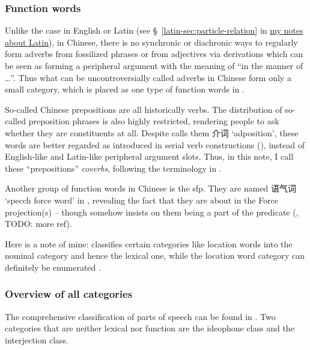 \documentclass[UTF8, a4paper, oneside, scheme=plain]{ctexart}
\newcommand*{\citesec}[1]{\S~{#1}}
\newcommand*{\term}[1]{\emph{#1}}
\newcommand{\latin}{\href{../Latin/latin-notes.pdf}{my notes about Latin}}
\newcommand{\translate}[1]{`#1'}
\begin{document}
\subsubsection{Function words}\label{sec:function-word-introduction}

Unlike the case in English or Latin 
(see \citesec{\ref{latin-sec:particle-relation}} in \latin), 
in Chinese, there is no synchronic or diachronic ways 
to regularly form adverbs from fossilized phrases 
or from adjectives via derivations 
which can be seen as forming a peripheral argument 
with the meaning of ``in the manner of \dots''.
Thus what can be uncontroversially called adverbs in Chinese 
form only a small category,
which is placed as one type of function words in \citet{zhudexigrammar}.

So-called Chinese prepositions are all historically verbs.
The distribution of so-called preposition phrases %
is also highly restricted,
rendering people to ask whether they are constituents at all.
Despite \citet{zhudexigrammar} calls them 介词 \translate{adposition},
these words are better regarded as introduced in serial verb constructions
(),
instead of English-like and Latin-like peripheral argument slots.
Thus, in this note, I call these ``prepositions'' \term{coverbs},
following the terminology in \citet{po2015chinese}.

Another group of function words in Chinese is the \ac{sfp}.
They are named 语气词 \translate{specch force word} in \citet{zhudexigrammar},
revealing the fact that they are about in the Force projection(s)
-- though \citet{zhudexigrammar} somehow insists on them being a part of the predicate
(, TODO: more ref).

Here is a note of mine: 
\citep[\citesec{3.6}]{zhudexigrammar} classifies 
certain categories like location words %
into the nominal category and hence the lexical one,
while the location word category can definitely be enumerated \citep[\citesec{4.4}]{zhudexigrammar}.

\subsubsection{Overview of all categories}

The comprehensive classification of parts of speech can be found in \citet[\citesec{3.6}]{zhudexigrammar}.
Two categories that are neither lexical nor function 
are the ideophone class and the interjection class.
\end{document}
